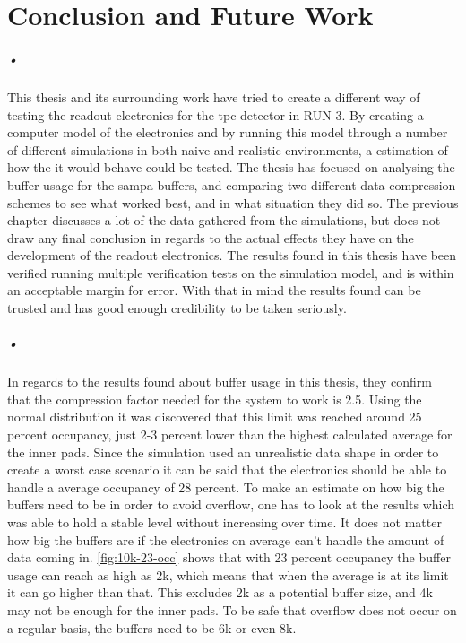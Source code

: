 \documentclass[a4paper, 12pt, openright, twoside]{report}
\begin{document}
\chapter{Conclusion and Future Work}

\paragraph{•}
This thesis and its surrounding work have tried to create a different way of testing the readout electronics for the \gls{tpc} detector in RUN 3.
By creating a computer model of the electronics and by running this model through a number of different simulations in both naive and realistic environments, a estimation of how the it would behave could be tested.
The thesis has focused on analysing the buffer usage for the \gls{sampa} buffers, and comparing two different data compression schemes to see what worked best, and in what situation they did so.
The previous chapter discusses a lot of the data gathered from the simulations, but does not draw any final conclusion in regards to the actual effects they have on the development of the readout electronics.
The results found in this thesis have been verified running multiple verification tests on the simulation model, and is within an acceptable margin for error.
With that in mind the results found can be trusted and has good enough credibility to be taken seriously.

\paragraph{•}
In regards to the results found about buffer usage in this thesis, they confirm that the compression factor needed for the system to work is 2.5.
Using the normal distribution it was discovered that this limit was reached around 25 percent occupancy, just 2-3 percent lower than the highest calculated average for the inner pads.
Since the simulation used an unrealistic data shape in order to create a worst case scenario it can be said that the electronics should be able to handle a average occupancy of 28 percent.
To make an estimate on how big the buffers need to be in order to avoid overflow, one has to look at the results which was able to hold a stable level without increasing over time.
It does not matter how big the buffers are if the electronics on average can't handle the amount of data coming in.
\ref{fig:10k-23-occ} shows that with 23 percent occupancy the buffer usage can reach as high as 2k, which means that when the average is at its limit it can go higher than that.
This excludes 2k as a potential buffer size, and 4k may not be enough for the inner pads.
To be safe that overflow does not occur on a regular basis, the buffers need to be 6k or even 8k.
\end{document}
